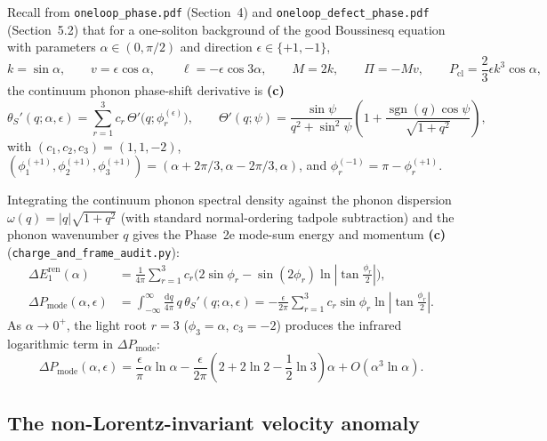 \documentclass[11pt,a4paper]{article}
\newcommand{\dd}{\mathrm{d}}
\newcommand{\sgn}{\operatorname{sgn}}
\begin{document}
Recall from \texttt{oneloop\_phase.pdf} (Section~4) and
\texttt{oneloop\_defect\_phase.pdf} (Section~5.2) that for a one-soliton
background of the good Boussinesq equation with parameters $\alpha \in (0,\pi/2)$
and direction $\epsilon \in \{+1,-1\}$,
\begin{equation}
  k = \sin\alpha, \qquad v = \epsilon\cos\alpha, \qquad
  \ell = -\epsilon\cos 3\alpha, \qquad M = 2k, \qquad
  \Pi = -Mv, \qquad P_{\mathrm{cl}} = \frac{2}{3}\epsilon k^3\cos\alpha,
  \label{eq:soliton_data}
\end{equation}
the continuum phonon phase-shift derivative is \textbf{(c)}
\begin{equation}
  \theta_S'(q;\alpha,\epsilon)
  = \sum_{r=1}^3 c_r\,\Theta'\!\big(q;\phi_r^{(\epsilon)}\big), \qquad
  \Theta'(q;\psi) = \frac{\sin\psi}{q^2+\sin^2\psi}\left(1 + \frac{\sgn(q)\cos\psi}{\sqrt{1+q^2}}\right),
  \label{eq:theta_S_prime}
\end{equation}
with $(c_1,c_2,c_3) = (1,1,-2)$,
$(\phi_1^{(+1)},\phi_2^{(+1)},\phi_3^{(+1)}) = (\alpha+2\pi/3,\alpha-2\pi/3,\alpha)$,
and $\phi_r^{(-1)} = \pi - \phi_r^{(+1)}$.

Integrating the continuum phonon spectral density against the phonon dispersion
$\omega(q) = |q|\sqrt{1+q^2}$ (with standard normal-ordering tadpole subtraction)
and the phonon wavenumber $q$ gives the Phase~2e mode-sum energy and momentum
\textbf{(c)} (\texttt{charge\_and\_frame\_audit.py}):
\begin{align}
  \Delta E_1^{\mathrm{ren}}(\alpha)
  &= \frac{1}{4\pi}\sum_{r=1}^3 c_r\Big(2\sin\phi_r - \sin(2\phi_r)\ln\!\left|\tan\frac{\phi_r}{2}\right|\Big),
  \label{eq:Delta_E_mode} \\
  \Delta P_{\mathrm{mode}}(\alpha,\epsilon)
  &= \int_{-\infty}^\infty \frac{\dd q}{4\pi}\,q\,\theta_S'(q;\alpha,\epsilon)
  = -\frac{\epsilon}{2\pi}\sum_{r=1}^3 c_r\sin\phi_r\ln\!\left|\tan\frac{\phi_r}{2}\right|.
  \label{eq:Delta_P_mode}
\end{align}
As $\alpha\to 0^+$, the light root $r=3$ ($\phi_3=\alpha$, $c_3=-2$) produces the
infrared logarithmic term in $\Delta P_{\mathrm{mode}}$:
\begin{equation}
  \Delta P_{\mathrm{mode}}(\alpha,\epsilon)
  = \frac{\epsilon}{\pi}\alpha\ln\alpha
  - \frac{\epsilon}{2\pi}\left(2 + 2\ln 2 - \frac{1}{2}\ln 3\right)\alpha
  + O(\alpha^3\ln\alpha).
  \label{eq:Delta_P_mode_small}
\end{equation}

\subsection{The non-Lorentz-invariant velocity anomaly}
\end{document}

